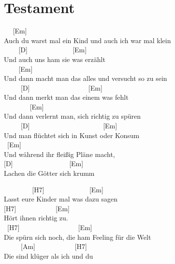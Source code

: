 \documentclass[
  letterpaper,
  twoside=false]{scrbook}
\begin{document}
\hypertarget{testament}{%
\chapter{Testament}\label{testament}}

~ ~{[}Em{]}\\
Auch du warst mal ein Kind und auch ich war mal klein\\
\hspace*{0.333em} ~ ~ ~{[}D{]} ~ ~ ~ ~ ~ ~ ~ ~{[}Em{]}\\
Und auch uns ham sie was erzählt\\
\hspace*{0.333em} ~ ~ ~{[}Em{]}\\
Und dann macht man das alles und versucht so zu sein\\
\hspace*{0.333em} ~ ~ ~ {[}D{]} ~ ~ ~ ~ ~ ~ ~ ~ ~ ~ {[}Em{]}\\
Und dann merkt man das einem was fehlt\\
\hspace*{0.333em} ~ ~ ~ ~ ~{[}Em{]}\\
Und dann verlernt man, sich richtig zu spüren\\
\hspace*{0.333em} ~ ~ ~ {[}D{]} ~ ~ ~ ~ ~ ~ ~ ~ ~ ~ ~ ~ ~{[}Em{]}\\
Und man flüchtet sich in Kunst oder Konsum\\
\hspace*{0.333em} ~{[}Em{]}\\
Und während ihr fleißig Pläne macht,\\
{[}D{]} ~ ~ ~ ~ ~ ~ ~ ~ ~ ~{[}Em{]}\\
Lachen die Götter sich krumm

~ ~ ~ ~ ~ {[}H7{]} ~ ~ ~ ~ ~ ~ ~ ~{[}Em{]}\\
Lasst eure Kinder mal was dazu sagen\\
{[}H7{]} ~ ~ ~ ~ ~ ~ ~{[}Em{]}\\
Hört ihnen richtig zu.\\
\hspace*{0.333em} ~{[}H7{]} ~ ~ ~ ~ ~ ~ ~ ~ ~ ~ {[}Em{]}\\
Die spürn sich noch, die ham Feeling für die Welt\\
\hspace*{0.333em} ~ ~ ~ {[}Am{]} ~ ~ ~ ~ ~ ~ ~{[}H7{]}\\
Die sind klüger als ich und du
\end{document}
